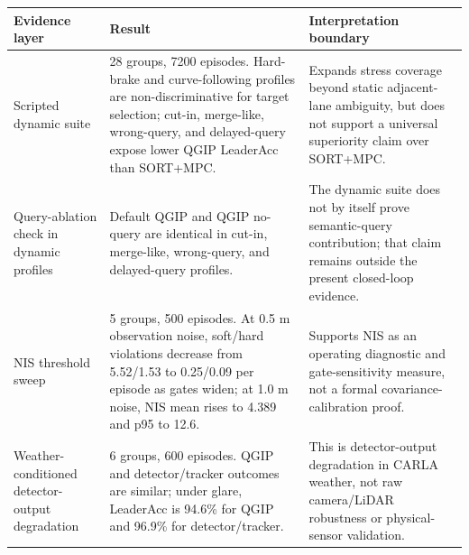 \begin{tabular}{p{} p{} p{}}
\toprule
\textbf{Evidence layer} & \textbf{Result} & \textbf{Interpretation boundary} \\
\midrule
Scripted dynamic suite & 28 groups, 7200 episodes. Hard-brake and curve-following profiles are non-discriminative for target selection; cut-in, merge-like, wrong-query, and delayed-query expose lower QGIP LeaderAcc than SORT+MPC. & Expands stress coverage beyond static adjacent-lane ambiguity, but does not support a universal superiority claim over SORT+MPC. \\
Query-ablation check in dynamic profiles & Default QGIP and QGIP no-query are identical in cut-in, merge-like, wrong-query, and delayed-query profiles. & The dynamic suite does not by itself prove semantic-query contribution; that claim remains outside the present closed-loop evidence. \\
NIS threshold sweep & 5 groups, 500 episodes. At 0.5 m observation noise, soft/hard violations decrease from 5.52/1.53 to 0.25/0.09 per episode as gates widen; at 1.0 m noise, NIS mean rises to 4.389 and p95 to 12.6. & Supports NIS as an operating diagnostic and gate-sensitivity measure, not a formal covariance-calibration proof. \\
Weather-conditioned detector-output degradation & 6 groups, 600 episodes. QGIP and detector/tracker outcomes are similar; under glare, LeaderAcc is 94.6\% for QGIP and 96.9\% for detector/tracker. & This is detector-output degradation in CARLA weather, not raw camera/LiDAR robustness or physical-sensor validation. \\
\bottomrule
\end{tabular}
